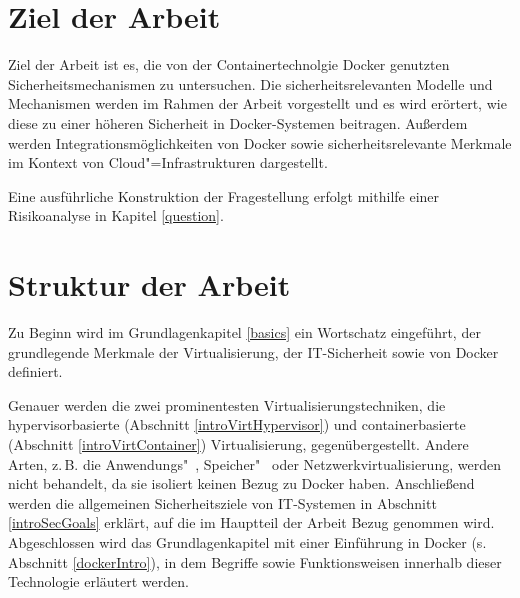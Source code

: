 \documentclass[../main.tex]{subfiles}
\begin{document}


  \section{Ziel der Arbeit}
    Ziel der Arbeit ist es, die von der Containertechnolgie Docker genutzten Sicherheitsmechanismen zu untersuchen. Die sicherheitsrelevanten Modelle und Mechanismen werden im Rahmen der Arbeit vorgestellt und es wird erörtert, wie diese zu einer höheren Sicherheit in Docker-Systemen beitragen.
    Außerdem werden Integrationsmöglichkeiten von Docker sowie sicherheitsrelevante Merkmale im Kontext von Cloud"=Infrastrukturen dargestellt.

    Eine ausführliche Konstruktion der Fragestellung erfolgt mithilfe einer Risikoanalyse in Kapitel \ref{question}.

  \section{Struktur der Arbeit}
    Zu Beginn wird im Grundlagenkapitel \ref{basics} ein Wortschatz eingeführt, der grundlegende Merkmale der Virtualisierung, der \acrshort{IT}-Sicherheit sowie von Docker definiert.

    Genauer werden die zwei prominentesten Virtualisierungstechniken, die hypervisorbasierte (Abschnitt \ref{introVirtHypervisor}) und containerbasierte (Abschnitt \ref{introVirtContainer}) Virtualisierung, gegenübergestellt. Andere Arten, z.\,B. die Anwendungs"~, Spei\-cher"~ oder Netzwerkvirtualisierung, werden nicht behandelt, da sie isoliert keinen Bezug zu Docker haben.  %
    Anschließend werden die allgemeinen Sicherheitsziele von \acrshort{IT}-Systemen in Abschnitt \ref{introSecGoals} erklärt, auf die im Hauptteil der Arbeit Bezug genommen wird. Abgeschlossen wird das Grundlagenkapitel mit einer Einführung in Docker (s. Abschnitt \ref{dockerIntro}), in dem Begriffe sowie Funktionsweisen innerhalb dieser Technologie erläutert werden.
\end{document}
